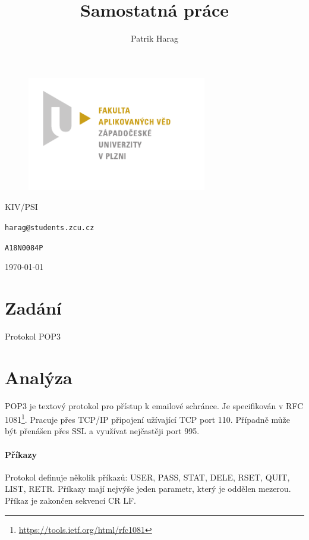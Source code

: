 \documentclass[12pt, a4paper]{article}
\title{Samostatná práce}
\author{Patrik Harag}
\makeatletter
\def \thesubtitle {KIV/PSI}
\def \theauthoremail {harag@students.zcu.cz}
\def \theauthorid {A18N0084P}
\makeatother
\begin{document}
\begin{titlepage}
	\begin{figure}
		\includegraphics[height=50mm]{img-fav-logo}
	\end{figure}
	
	\centering
	{\large \hspace{1mm} \par} %
	\vspace{15ex}
	
	{\huge\bfseries \thetitle \par}
	\vspace{2ex}
	{\scshape\Large \thesubtitle \par}
	\vspace{15ex}
	{\Large\itshape \theauthor \par}
	\vspace{2ex}
	{\texttt{\theauthoremail} \par}
	\vspace{1ex}
	{\texttt{\theauthorid} \par}
	
	\vfill

	{\today\par}
\end{titlepage}


\section*{Zadání}
Protokol POP3


\section*{Analýza}
POP3 je textový protokol pro přístup k emailové schránce.
Je specifikován v RFC 1081\footnote{\url{https://tools.ietf.org/html/rfc1081}}.
Pracuje přes TCP/IP připojení užívající TCP port 110.
Případně může být přenášen přes SSL a využívat nejčastěji port 995.

\paragraph{Příkazy}
Protokol definuje několik příkazů: USER, PASS, STAT, DELE, RSET, QUIT, LIST, RETR.
Příkazy mají nejvýše jeden parametr, který je oddělen mezerou. Příkaz je zakončen sekvencí CR LF.
\end{document}
